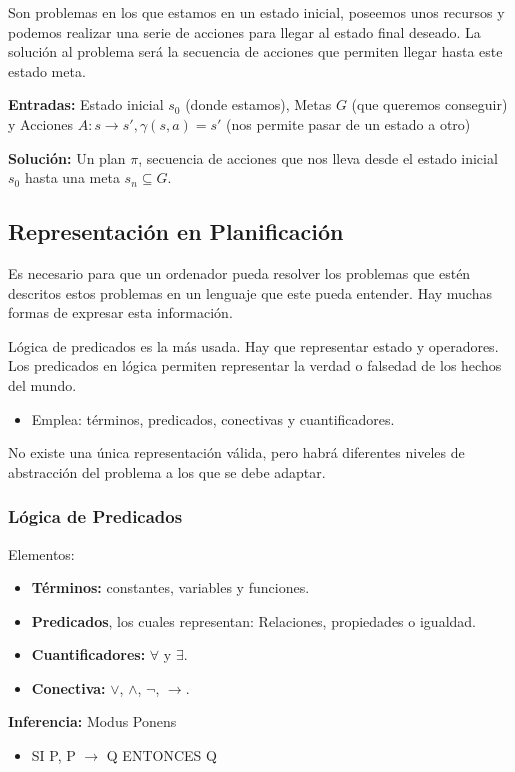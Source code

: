\documentclass[12pt, twoside, openright]{report} %
\begin{document}
Son problemas en los que estamos en un estado inicial, poseemos unos recursos y podemos realizar una serie de acciones para llegar al estado final deseado. La solución al problema será la secuencia de acciones que permiten llegar hasta este estado meta.

\textbf{Entradas:} Estado inicial $s_0$ (donde estamos), Metas $G$ (que queremos conseguir) y Acciones $A: s \rightarrow s', \gamma(s, a) = s'$ (nos permite pasar de un estado a otro)

\textbf{Solución:} Un plan $\pi$, secuencia de acciones que nos lleva desde el estado inicial $s_0$ hasta una meta $s_n \subseteq G$.

\subsection{Representación en Planificación}
Es necesario para que un ordenador pueda resolver los problemas que estén descritos estos problemas en un lenguaje  que este pueda entender. Hay muchas formas de expresar esta información.

Lógica de predicados es la más usada. Hay que representar estado y operadores. Los predicados en lógica permiten representar la verdad o falsedad de los hechos del mundo.
\begin{itemize}
	\item Emplea: términos, predicados, conectivas y cuantificadores.
\end{itemize}

No existe una única representación válida, pero habrá diferentes niveles de abstracción del problema a los que se debe adaptar.

\subsubsection{Lógica de Predicados}
Elementos:
\begin{itemize}
	\item \textbf{Términos:} constantes, variables y funciones.
	\item \textbf{Predicados}, los cuales representan: Relaciones, propiedades o igualdad.
	\item \textbf{Cuantificadores:} $\forall$ y $\exists$.
	\item \textbf{Conectiva:} $\vee$, $\wedge$, $\neg$, $\rightarrow$.
\end{itemize}
	
\textbf{Inferencia:} Modus Ponens
\begin{itemize}
	\item SI P, P $\rightarrow$ Q ENTONCES Q
\end{itemize}	
\end{document}
